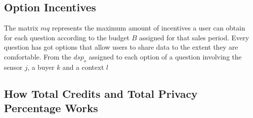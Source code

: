 \subsection{Option Incentives}
The matrix $mq$ represents the maximum amount of incentives a user can obtain for each question according to the budget $B$
assigned for that sales period. Every question has got options that allow users to share data to the extent they are comfortable.
From the $dsp_o$ assigned to each option of a question involving the sensor $j$, a buyer $k$ and a context $l$

\subsection{How Total Credits and Total Privacy Percentage Works}